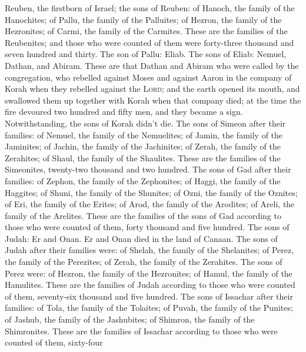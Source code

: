  Reuben, the firstborn of Israel; the sons of Reuben: of
Hanoch, the family of the Hanochites; of Pallu, the family of the
Palluites;  of Hezron, the family of the Hezronites; of
Carmi, the family of the Carmites.  These are the families
of the Reubenites; and those who were counted of them were forty-three
thousand and seven hundred and thirty.  The son of Pallu:
Eliab.  The sons of Eliab: Nemuel, Dathan, and Abiram.
These are that Dathan and Abiram who were called by the congregation,
who rebelled against Moses and against Aaron in the company of Korah
when they rebelled against the \textsc{Lord};  and the
earth opened its mouth, and swallowed them up together with Korah when
that company died; at the time the fire devoured two hundred and fifty
men, and they became a sign.  Notwithstanding, the sons
of Korah didn't die.  The sons of Simeon after their
families: of Nemuel, the family of the Nemuelites; of Jamin, the family
of the Jaminites; of Jachin, the family of the Jachinites;
 of Zerah, the family of the Zerahites; of Shaul, the
family of the Shaulites.  These are the families of the
Simeonites, twenty-two thousand and two hundred.  The
sons of Gad after their families: of Zephon, the family of the
Zephonites; of Haggi, the family of the Haggites; of Shuni, the family
of the Shunites;  of Ozni, the family of the Oznites; of
Eri, the family of the Erites;  of Arod, the family of
the Arodites; of Areli, the family of the Arelites. 
These are the families of the sons of Gad according to those who were
counted of them, forty thousand and five hundred.  The
sons of Judah: Er and Onan. Er and Onan died in the land of Canaan.
 The sons of Judah after their families were: of Shelah,
the family of the Shelanites; of Perez, the family of the Perezites; of
Zerah, the family of the Zerahites.  The sons of Perez
were: of Hezron, the family of the Hezronites; of Hamul, the family of
the Hamulites.  These are the families of Judah according
to those who were counted of them, seventy-six thousand and five
hundred.  The sons of Issachar after their families: of
Tola, the family of the Tolaites; of Puvah, the family of the Punites;
 of Jashub, the family of the Jashubites; of Shimron, the
family of the Shimronites.  These are the families of
Issachar according to those who were counted of them, sixty-four
